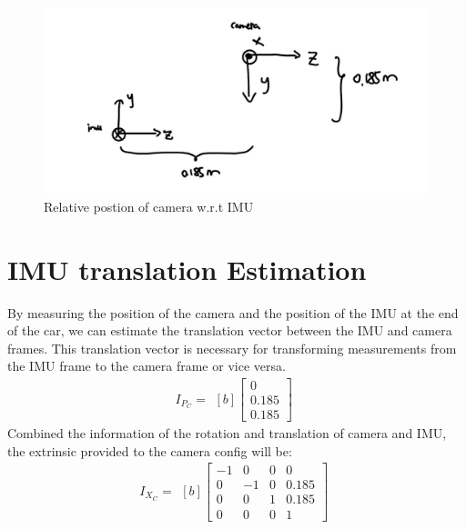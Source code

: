 \documentclass{article}
\begin{document}
\begin{figure}[H]
    \centering
    \includegraphics[width=1\textwidth]{imu_layout.jpeg}
    \caption{Relative postion of camera w.r.t IMU}
    \label{fig:IMU pos}
\end{figure}

\section*{IMU translation Estimation}
By measuring the position of the camera and the position of the IMU at the end of the car, 
we can estimate the translation vector between the IMU and camera frames. 
This translation vector is necessary for transforming 
measurements from the IMU frame to the camera frame or vice versa.
\begin{equation}
    I_{P_C} = 
    \begin{aligned}[b]
        \begin{bmatrix}
            0     \\
            0.185  \\
            0.185 
        \end{bmatrix}
    \end{aligned}
\end{equation}
Combined the information of the rotation and translation of camera and IMU,
the extrinsic provided to the camera config will be:
\begin{equation}
    I_{X_C} =
    \begin{aligned}[b]
        \begin{bmatrix}
            -1 & 0 & 0 &0\\
            0 & -1 & 0 &0.185\\
            0 & 0 & 1  &0.185\\
            0 & 0& 0& 1
        \end{bmatrix}
    \end{aligned}
\end{equation}
\end{document}
